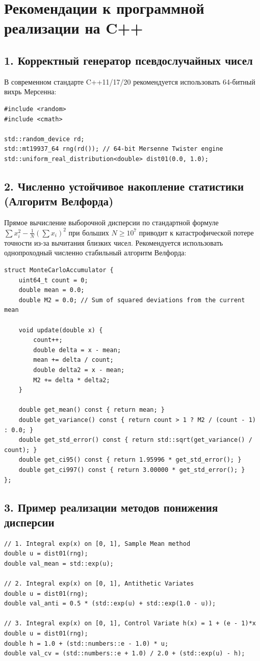\documentclass[11pt,a4paper]{article}
\begin{document}
\newpage

\section{Рекомендации к программной реализации на C++}

\subsection{1. Корректный генератор псевдослучайных чисел}
В современном стандарте C++11/17/20 рекомендуется использовать 64-битный вихрь Мерсенна:
\begin{lstlisting}
#include <random>
#include <cmath>

std::random_device rd;
std::mt19937_64 rng(rd()); // 64-bit Mersenne Twister engine
std::uniform_real_distribution<double> dist01(0.0, 1.0);
\end{lstlisting}

\subsection{2. Численно устойчивое накопление статистики (Алгоритм Велфорда)}
Прямое вычисление выборочной дисперсии по стандартной формуле $\sum x_i^2 - \frac{1}{N}(\sum x_i)^2$ при больших $N \ge 10^7$ приводит к катастрофической потере точности из-за вычитания близких чисел. Рекомендуется использовать однопроходный численно стабильный алгоритм Велфорда:

\begin{lstlisting}
struct MonteCarloAccumulator {
    uint64_t count = 0;
    double mean = 0.0;
    double M2 = 0.0; // Sum of squared deviations from the current mean

    void update(double x) {
        count++;
        double delta = x - mean;
        mean += delta / count;
        double delta2 = x - mean;
        M2 += delta * delta2;
    }

    double get_mean() const { return mean; }
    double get_variance() const { return count > 1 ? M2 / (count - 1) : 0.0; }
    double get_std_error() const { return std::sqrt(get_variance() / count); }
    double get_ci95() const { return 1.95996 * get_std_error(); }
    double get_ci997() const { return 3.00000 * get_std_error(); }
};
\end{lstlisting}

\subsection{3. Пример реализации методов понижения дисперсии}
\begin{lstlisting}
// 1. Integral exp(x) on [0, 1], Sample Mean method
double u = dist01(rng);
double val_mean = std::exp(u);

// 2. Integral exp(x) on [0, 1], Antithetic Variates
double u = dist01(rng);
double val_anti = 0.5 * (std::exp(u) + std::exp(1.0 - u));

// 3. Integral exp(x) on [0, 1], Control Variate h(x) = 1 + (e - 1)*x
double u = dist01(rng);
double h = 1.0 + (std::numbers::e - 1.0) * u;
double val_cv = (std::numbers::e + 1.0) / 2.0 + (std::exp(u) - h);
\end{lstlisting}
\end{document}
